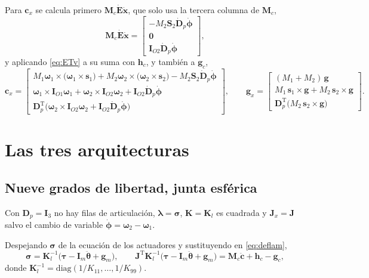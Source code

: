 \documentclass[11pt]{article}
\newcommand{\T}{^{\mathrm{T}}}
\newcommand{\wv}{\boldsymbol{\omega}}
\newcommand{\lam}{\boldsymbol{\lambda}}
\newcommand{\sig}{\boldsymbol{\sigma}}
\newcommand{\cdd}{\ddot{\mathbf{c}}}
\newcommand{\xd}{\dot{\mathbf{x}}}
\newcommand{\IO}[1]{\mathbf{I}_{O#1}}
\newcommand{\thv}{\boldsymbol{\theta}}
\newcommand{\tauv}{\boldsymbol{\tau}}
\begin{document}
Para $\mathbf{c}_x$ se calcula primero $\mathbf{M}_c\dot{\mathbf{E}}\xd$, que solo usa la tercera columna de $\mathbf{M}_c$,
\begin{equation}
\mathbf{M}_c\dot{\mathbf{E}}\xd=\begin{bmatrix}-M_2\mathbf{S}_2\dot{\mathbf{D}}_p\dot{\boldsymbol{\phi}}\\ \mathbf{0}\\ \IO{2}\dot{\mathbf{D}}_p\dot{\boldsymbol{\phi}}\end{bmatrix},
\label{eq:McEd}
\end{equation}
y aplicando \eqref{eq:ETv} a su suma con $\mathbf{h}_c$, y también a $\mathbf{g}_c$,
\begin{equation}
\mathbf{c}_x=
\begin{bmatrix}
M_1\wv_1\times\big(\wv_1\times\mathbf{s}_1\big)+M_2\wv_2\times\big(\wv_2\times\mathbf{s}_2\big)-M_2\mathbf{S}_2\dot{\mathbf{D}}_p\dot{\boldsymbol{\phi}}\\[2pt]
\wv_1\times\IO{1}\wv_1+\wv_2\times\IO{2}\wv_2+\IO{2}\dot{\mathbf{D}}_p\dot{\boldsymbol{\phi}}\\[2pt]
\mathbf{D}_p\T\big(\wv_2\times\IO{2}\wv_2+\IO{2}\dot{\mathbf{D}}_p\dot{\boldsymbol{\phi}}\big)
\end{bmatrix},
\qquad
\mathbf{g}_x=
\begin{bmatrix}
(M_1+M_2)\,\mathbf{g}\\[2pt]
M_1\,\mathbf{s}_1\times\mathbf{g}+M_2\,\mathbf{s}_2\times\mathbf{g}\\[2pt]
\mathbf{D}_p\T\big(M_2\,\mathbf{s}_2\times\mathbf{g}\big)
\end{bmatrix}.
\label{eq:cxgx}
\end{equation}

\section{Las tres arquitecturas}

\subsection{Nueve grados de libertad, junta esférica}

Con $\mathbf{D}_p=\mathbf{I}_3$ no hay filas de articulación, $\lam=\sig$, $\mathbf{K}=\mathbf{K}_l$ es cuadrada y $\mathbf{J}_x=\mathbf{J}$ salvo el cambio de variable $\dot{\boldsymbol{\phi}}=\wv_2-\wv_1$.

Despejando $\sig$ de la ecuación de los actuadores y sustituyendo en \eqref{eq:deflam},
\begin{equation}
\sig=\mathbf{K}_l^{-1}\big(\tauv-\mathbf{I}_m\ddot{\thv}+\mathbf{g}_m\big),
\qquad
\mathbf{J}\T\mathbf{K}_l^{-1}\big(\tauv-\mathbf{I}_m\ddot{\thv}+\mathbf{g}_m\big)=\mathbf{M}_c\cdd+\mathbf{h}_c-\mathbf{g}_c ,
\label{eq:caso9}
\end{equation}
donde $\mathbf{K}_l^{-1}=\mathrm{diag}(1/K_{11},\dots,1/K_{99})$.
\end{document}
